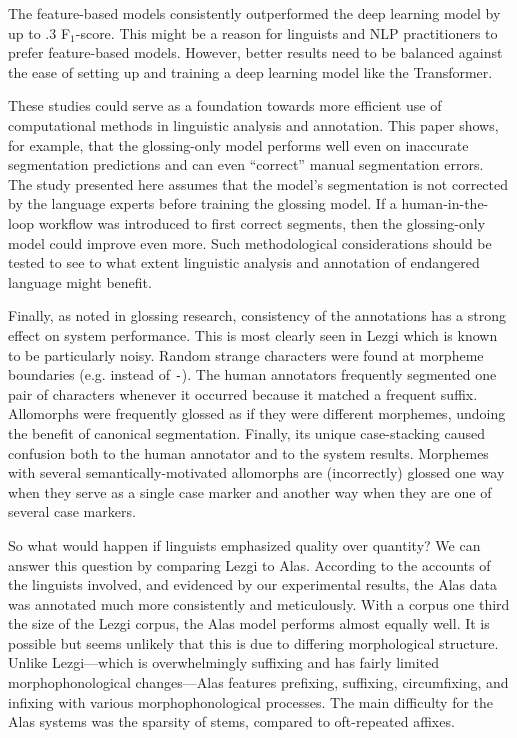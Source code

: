 The feature-based models consistently outperformed the deep learning model by up to .3 F$_1$-score. This might be a reason for linguists and NLP practitioners to prefer feature-based models. However, better results need to be balanced against the ease of setting up and training a deep learning model like the Transformer. 

These studies could serve as a foundation towards more efficient use of computational methods in linguistic analysis and annotation. This paper shows, for example, that the glossing-only model performs well even on inaccurate segmentation predictions and can even ``correct'' manual segmentation errors. The study presented here assumes that the model's segmentation is not corrected by the language experts before training the glossing model. If a human-in-the-loop workflow was introduced to first correct segments, then the glossing-only model could improve even more. Such methodological considerations should be tested to see to what extent linguistic analysis and annotation of endangered language might benefit.

Finally, as \citet{mcmillan-major_automating_2020} noted in glossing research, consistency of the annotations has a strong effect on system performance. This is most clearly seen in Lezgi which is known to be particularly noisy. Random strange characters were found at morpheme boundaries (e.g. {\tt *} instead of  {\tt -}). The human annotators frequently segmented one pair of characters whenever it occurred because it matched a frequent suffix. Allomorphs were frequently glossed as if they were different morphemes, undoing the benefit of canonical segmentation. Finally, its unique case-stacking caused confusion both to the human annotator and to the system results. Morphemes with several semantically-motivated allomorphs are (incorrectly) glossed one way when they serve as a single case marker and another way when they are one of several case markers.

So what would happen if linguists emphasized quality over quantity? We can answer this question by comparing Lezgi to Alas. According to the accounts of the linguists involved, and evidenced by our experimental results, the Alas data was annotated much more consistently and meticulously. With a corpus one third the size of the Lezgi corpus, the Alas model performs almost equally well. It is possible but seems unlikely that this is due to differing morphological structure. Unlike Lezgi---which is overwhelmingly suffixing and has fairly limited morphophonological changes---Alas features prefixing, suffixing, circumfixing, and infixing with various morphophonological processes. The main difficulty for the Alas systems was the sparsity of stems, compared to oft-repeated affixes. 

